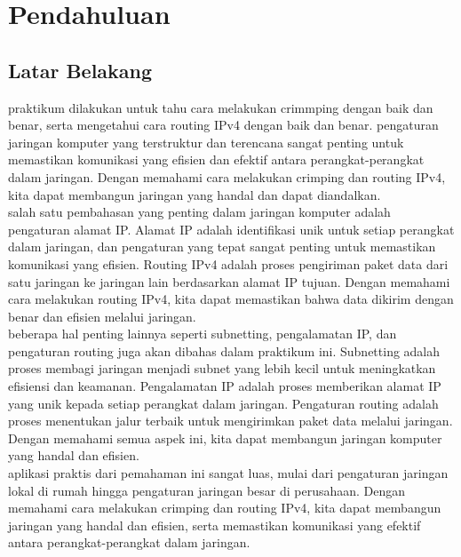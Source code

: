 \section{Pendahuluan}
\subsection{Latar Belakang}
praktikum dilakukan untuk tahu cara melakukan crimmping dengan baik dan benar, serta mengetahui cara routing IPv4 dengan baik dan benar. pengaturan jaringan komputer yang terstruktur dan terencana sangat penting untuk memastikan komunikasi yang efisien dan efektif antara perangkat-perangkat dalam jaringan. Dengan memahami cara melakukan crimping dan routing IPv4, kita dapat membangun jaringan yang handal dan dapat diandalkan.\\
salah satu pembahasan yang penting dalam jaringan komputer adalah pengaturan alamat IP. Alamat IP adalah identifikasi unik untuk setiap perangkat dalam jaringan, dan pengaturan yang tepat sangat penting untuk memastikan komunikasi yang efisien. Routing IPv4 adalah proses pengiriman paket data dari satu jaringan ke jaringan lain berdasarkan alamat IP tujuan. Dengan memahami cara melakukan routing IPv4, kita dapat memastikan bahwa data dikirim dengan benar dan efisien melalui jaringan.\\
beberapa hal penting lainnya seperti subnetting, pengalamatan IP, dan pengaturan routing juga akan dibahas dalam praktikum ini. Subnetting adalah proses membagi jaringan menjadi subnet yang lebih kecil untuk meningkatkan efisiensi dan keamanan. Pengalamatan IP adalah proses memberikan alamat IP yang unik kepada setiap perangkat dalam jaringan. Pengaturan routing adalah proses menentukan jalur terbaik untuk mengirimkan paket data melalui jaringan. Dengan memahami semua aspek ini, kita dapat membangun jaringan komputer yang handal dan efisien.\\
aplikasi praktis dari pemahaman ini sangat luas, mulai dari pengaturan jaringan lokal di rumah hingga pengaturan jaringan besar di perusahaan. Dengan memahami cara melakukan crimping dan routing IPv4, kita dapat membangun jaringan yang handal dan efisien, serta memastikan komunikasi yang efektif antara perangkat-perangkat dalam jaringan.\\

